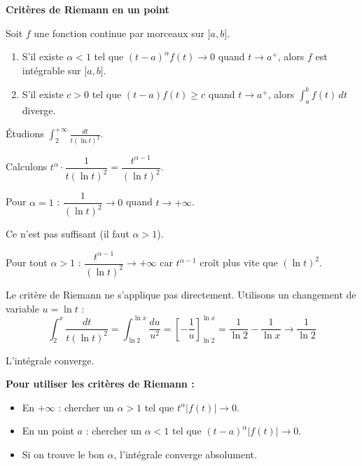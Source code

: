 \documentclass[../PolyS4.tex]{subfiles}
\begin{document}
\begin{Thm}
\textbf{Critères de Riemann en un point}

Soit $f$ une fonction continue par morceaux sur $]a, b]$.

\begin{enumerate}
\item S'il existe $\alpha < 1$ tel que $(t-a)^{\alpha} f(t) \to 0$ quand $t \to a^{+}$, alors $f$ est intégrable sur $]a, b]$.

\item S'il existe $c > 0$ tel que $(t-a) f(t) \geq c$ quand $t \to a^{+}$, alors $\displaystyle\int_{a}^{b} f(t) \, dt$ diverge.
\end{enumerate}
\end{Thm}

\begin{Ex}
Étudions $\displaystyle\int_{2}^{+\infty} \frac{dt}{t(\ln t)^2}$.

Calculons $t^{\alpha} \cdot \dfrac{1}{t(\ln t)^2} = \dfrac{t^{\alpha - 1}}{(\ln t)^2}$.

Pour $\alpha = 1$ : $\dfrac{1}{(\ln t)^2} \to 0$ quand $t \to +\infty$.

Ce n'est pas suffisant (il faut $\alpha > 1$).

Pour tout $\alpha > 1$ : $\dfrac{t^{\alpha - 1}}{(\ln t)^2} \to +\infty$ car $t^{\alpha - 1}$ croît plus vite que $(\ln t)^2$.

Le critère de Riemann ne s'applique pas directement. Utilisons un changement de variable $u = \ln t$ :
$$\int_{2}^{x} \frac{dt}{t(\ln t)^2} = \int_{\ln 2}^{\ln x} \frac{du}{u^2} = \left[-\frac{1}{u}\right]_{\ln 2}^{\ln x} = \frac{1}{\ln 2} - \frac{1}{\ln x} \to \frac{1}{\ln 2}$$

L'intégrale converge.
\end{Ex}

\begin{Meth}
\textbf{Pour utiliser les critères de Riemann :}
\begin{itemize}
\item En $+\infty$ : chercher un $\alpha > 1$ tel que $t^{\alpha} |f(t)| \to 0$.
\item En un point $a$ : chercher un $\alpha < 1$ tel que $(t-a)^{\alpha} |f(t)| \to 0$.
\item Si on trouve le bon $\alpha$, l'intégrale converge absolument.
\end{itemize}
\end{Meth}

\newpage
\end{document}
